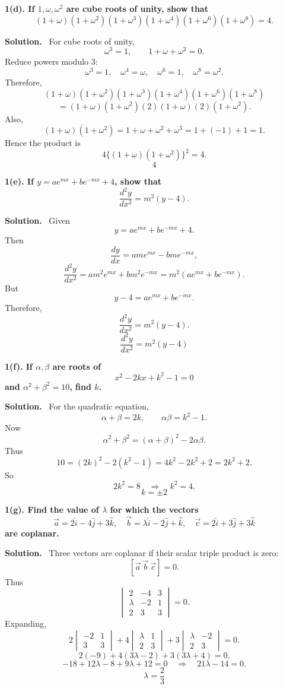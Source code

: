 \documentclass[11pt,a4paper]{article}
\newcommand{\question}[1]{\vspace{4pt}\begin{tcolorbox}[colback=softblue,colframe=headblue,boxrule=0.6pt,arc=2pt,left=5pt,right=5pt,top=4pt,bottom=4pt]\textbf{#1}\end{tcolorbox}}
\newcommand{\answer}{\textbf{Solution.}~}
\newcommand{\finalans}[1]{\[\boxed{#1}\]}
\begin{document}
\question{1(d). If $1,\omega,\omega^2$ are cube roots of unity, show that
\[
(1+\omega)(1+\omega^2)(1+\omega^3)(1+\omega^4)(1+\omega^6)(1+\omega^8)=4.
\]}
\answer
For cube roots of unity,
\[
\omega^3=1,\qquad 1+\omega+\omega^2=0.
\]
Reduce powers modulo $3$:
\[
\omega^3=1,
\quad \omega^4=\omega,
\quad \omega^6=1,
\quad \omega^8=\omega^2.
\]
Therefore,
\[
(1+\omega)(1+\omega^2)(1+\omega^3)(1+\omega^4)(1+\omega^6)(1+\omega^8)
\]
\[
=(1+\omega)(1+\omega^2)(2)(1+\omega)(2)(1+\omega^2).
\]
Also,
\[
(1+\omega)(1+\omega^2)=1+\omega+\omega^2+\omega^3
=1+(-1)+1=1.
\]
Hence the product is
\[
4\{(1+\omega)(1+\omega^2)\}^2=4.
\]
\finalans{4}

\question{1(e). If $y=ae^{mx}+be^{-mx}+4$, show that
\[
\frac{d^2y}{dx^2}=m^2(y-4).
\]}
\answer
Given
\[
y=ae^{mx}+be^{-mx}+4.
\]
Then
\[
\frac{dy}{dx}=am e^{mx}-bm e^{-mx},
\]
\[
\frac{d^2y}{dx^2}=am^2e^{mx}+bm^2e^{-mx}
=m^2(ae^{mx}+be^{-mx}).
\]
But
\[
y-4=ae^{mx}+be^{-mx}.
\]
Therefore,
\[
\frac{d^2y}{dx^2}=m^2(y-4).
\]
\finalans{\dfrac{d^2y}{dx^2}=m^2(y-4)}

\question{1(f). If $\alpha,\beta$ are roots of
\[
x^2-2kx+k^2-1=0
\]
and $\alpha^2+\beta^2=10$, find $k$.}
\answer
For the quadratic equation,
\[
\alpha+\beta=2k,
\qquad \alpha\beta=k^2-1.
\]
Now
\[
\alpha^2+\beta^2=(\alpha+\beta)^2-2\alpha\beta.
\]
Thus
\[
10=(2k)^2-2(k^2-1)=4k^2-2k^2+2=2k^2+2.
\]
So
\[
2k^2=8\quad\Rightarrow\quad k^2=4.
\]
\finalans{k=\pm2}

\question{1(g). Find the value of $\lambda$ for which the vectors
\[
\vec a=2\hat i-4\hat j+3\hat k,\quad
\vec b=\lambda\hat i-2\hat j+\hat k,
\quad \vec c=2\hat i+3\hat j+3\hat k
\]
are coplanar.}
\answer
Three vectors are coplanar if their scalar triple product is zero:
\[
[\vec a\ \vec b\ \vec c]=0.
\]
Thus
\[
\begin{vmatrix}
2&-4&3\\
\lambda&-2&1\\
2&3&3
\end{vmatrix}=0.
\]
Expanding,
\[
2\begin{vmatrix}-2&1\\3&3\end{vmatrix}
+4\begin{vmatrix}\lambda&1\\2&3\end{vmatrix}
+3\begin{vmatrix}\lambda&-2\\2&3\end{vmatrix}=0.
\]
\[
2(-9)+4(3\lambda-2)+3(3\lambda+4)=0.
\]
\[
-18+12\lambda-8+9\lambda+12=0
\quad\Rightarrow\quad 21\lambda-14=0.
\]
\finalans{\lambda=\frac{2}{3}}
\end{document}
